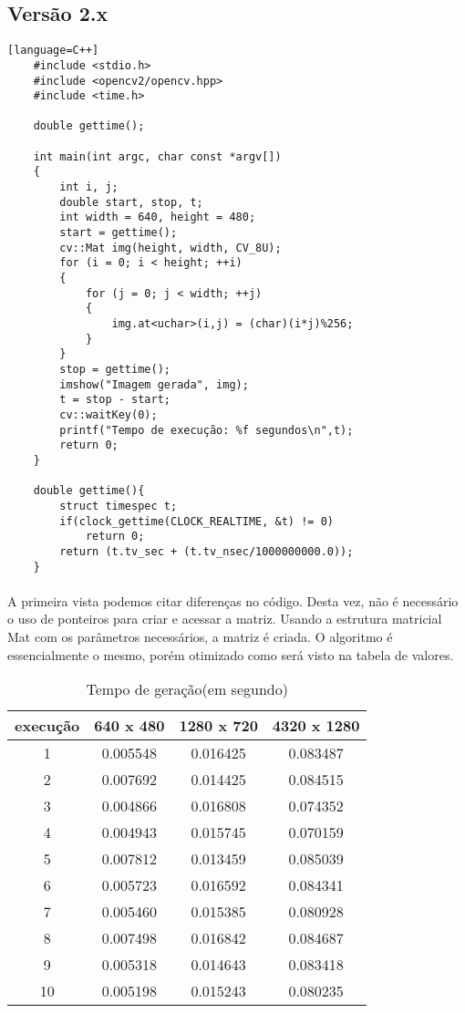\documentclass{article}
\begin{document}
	\subsection{Versão 2.x} %
	\label{sub:versao_2_x}
	\begin{verbatim}[language=C++]
	#include <stdio.h>
	#include <opencv2/opencv.hpp>
	#include <time.h>

	double gettime();

	int main(int argc, char const *argv[])
	{
		int i, j;
		double start, stop, t;
		int width = 640, height = 480;
		start = gettime();
		cv::Mat img(height, width, CV_8U);
		for (i = 0; i < height; ++i)
		{
			for (j = 0; j < width; ++j)
			{
				img.at<uchar>(i,j) = (char)(i*j)%256;
			}
		}
		stop = gettime();
		imshow("Imagem gerada", img);
		t = stop - start;
		cv::waitKey(0);
		printf("Tempo de execução: %f segundos\n",t);
		return 0; 
	}

	double gettime(){
		struct timespec t;
		if(clock_gettime(CLOCK_REALTIME, &t) != 0)
			return 0;
		return (t.tv_sec + (t.tv_nsec/1000000000.0));
	}
	\end{verbatim}
	\paragraph{} %
	A primeira vista podemos citar diferenças no código. Desta vez, não é necessário o uso de ponteiros para criar e acessar a matriz. Usando a estrutura matricial Mat com os parâmetros necessários, a matriz é criada. O algoritmo é essencialmente o mesmo, porém otimizado como será visto na tabela de valores.

	\begin{table}[ht]
		\caption{Tempo de geração(em segundo)}
		\centering
		\begin{tabular}{c c c c}
		\hline\hline
		execução & 640 x 480 & 1280 x 720 & 4320 x 1280\\
		\hline
		1 & 0.005548 & 0.016425 & 0.083487\\
		2 & 0.007692 & 0.014425 & 0.084515\\
		3 & 0.004866 & 0.016808 & 0.074352\\
		4 & 0.004943 & 0.015745 & 0.070159\\
		5 & 0.007812 & 0.013459 & 0.085039\\
		6 & 0.005723 & 0.016592 & 0.084341\\
		7 & 0.005460 & 0.015385 & 0.080928\\
		8 & 0.007498 & 0.016842 & 0.084687\\
		9 & 0.005318 & 0.014643 & 0.083418\\
		10 & 0.005198 & 0.015243 & 0.080235\\
		\hline
		\end{tabular}
		\label{table: execucao_2}
	\end{table}
\end{document}
